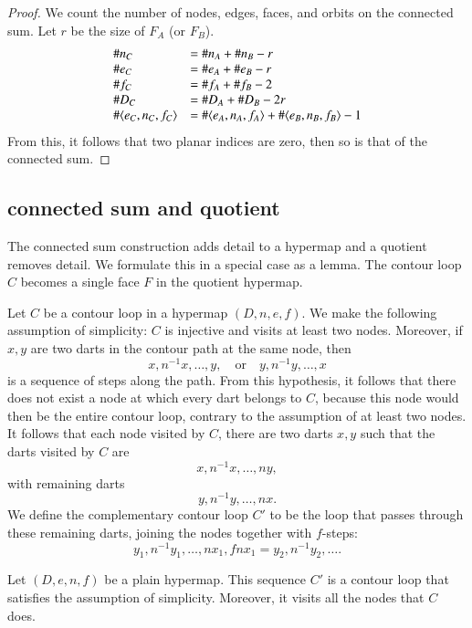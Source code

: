 \begin{proof}  We count the number of nodes, edges, faces, and orbits
on the connected sum.  Let $r$ be the size of $F_A$ (or $F_B$).
$$
\begin{array}{lll}
  \#n_C &= \#n_A + \#n_B - r\\
  \#e_C &= \#e_A + \#e_B - r\\
  \#f_C &= \#f_A + \#f_B - 2\\
  \#D_C &= \#D_A + \#D_B - 2 r\\ 
  \#\langle e_C,n_C,f_C\rangle &= \#\langle e_A,n_A,f_A\rangle + \#\langle e_B,n_B,f_B\rangle - 1\\
\end{array}
$$
From this, it follows that two planar indices are zero,
then so is that of the connected sum.
\end{proof}



\subsection{connected sum and quotient}

The connected sum construction adds detail to a hypermap and
a quotient removes detail.  We formulate this in a special
case as a lemma.    The contour loop $C$ becomes a single
face $F$ in the quotient hypermap.

Let $C$ be a contour loop in a hypermap $(D,n,e,f)$.
We make the following assumption of simplicity:
$C$ is injective and visits at least two nodes.  
Moreover, if $x,y$ are
two darts in the contour path at the same node, then
$$
x, n^{-1} x,\ldots, y,\quad\text{or}\quad y, n^{-1} y,\ldots, x
$$
is a sequence of steps along the path.
From this hypothesis, it follows that there does not exist a node
at which every dart belongs to $C$, because this node would then be
the entire contour loop, contrary to the assumption of at least two nodes.
It follows that each node visited by $C$, there are two darts $x,y$
such that the darts visited by $C$ are
   $$
   x,n^{-1}x,\ldots,n y,
   $$
with remaining darts
   $$
   y, n^{-1}y,\ldots, nx.
   $$
We define the complementary contour loop $C'$ to be the loop that
passes through these remaining darts, joining the nodes together with $f$-steps:
   $$
   y_1,n^{-1}y_1,\ldots,n x_1, f n x_1 = y_2, n^{-1} y_2,\ldots.
   $$

\begin{lemma}  Let $(D,e,n,f)$ be a plain hypermap.
This sequence $C'$ is a contour loop that satisfies the assumption
of simplicity.  Moreover, it visits all the nodes that $C$ does.  
\end{lemma}

